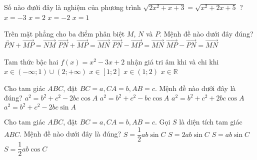 \begin{ex}%
	Số nào đưới đây là nghiệm của phương trình $\sqrt{2x^2+x+3}=\sqrt{x^2+2x+5}$ ?
	\choice
	{$x=-3$}
	{\True $x=2$}
	{$x=-2$}
	{$x=1$}
\end{ex}
\begin{ex}%
	Trên mặt phẳng cho ba điểm phân biệt $M$, $N$ và $P$. Mệnh đề nào dưới đây đúng?
	\choice
	{$\overleftrightarrow{P N}+\overrightarrow{M P}=\overrightarrow{N M}$}
	{\True $\overrightarrow{P N}+\overrightarrow{M P}=\overrightarrow{M N}$}
	{$\overrightarrow{P N}-\overrightarrow{M P}=\overrightarrow{M N}$}
	{$\overrightarrow{M P}-\overrightarrow{P N}=\overrightarrow{M N}$}
\end{ex}
\begin{ex}%
	Tam thức bậc hai $f(x)=x^2-3 x+2$ nhận giá tri âm khi và chi khi
	\choice
	{$x \in(-\infty ; 1) \cup(2 ;+\infty)$}
	{$x \in[1 ; 2]$}
	{\True $x \in(1 ; 2)$}
	{$x \in \mathbb{R}$}
\end{ex}
\begin{ex}%
	Cho tam giác $A B C$, đặt $B C=a, C A=b, A B=c$. Mệnh đề nào dưới đây là đúng?
	\choice
	{\True $a^2=b^2+c^2-2 b c \cos A$}
	{$a^2=b^2+c^2-b c \cos A$}
	{$a^2=b^2+c^2+2 b c \cos A$}
	{$a^2=b^2+c^2-2 b c \sin A$}
\end{ex}
\begin{ex}%
	Cho tam giác $A B C$, đặt $B C=a, C A=b, A B=c$. Gọi $S$ là diện tích tam giác $A B C$. Mệnh đề nào dưới đây là đúng?
	\choice
	{\True $S=\dfrac{1}{2} a b \sin C$}
	{$S=2 a b \sin C$}
	{$S=a b \sin C$}
	{$S=\dfrac{1}{2} a b \cos C$}
\end{ex}
